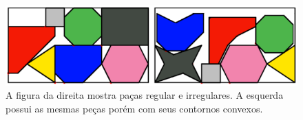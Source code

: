 \begin{figure}[!htb]
    \centering
    \includegraphics[scale=0.7]{utils/images/pieces-example}
    \caption{A figura da direita mostra paças regular e irregulares. A esquerda possui as mesmas peças porém com seus contornos convexos.}
    \label{fig:pieces-example}
\end{figure}
